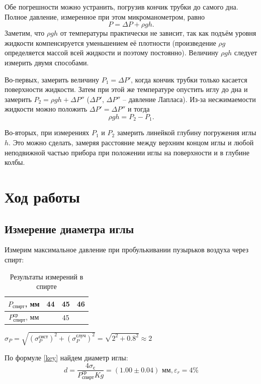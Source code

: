 \documentclass[a4paper,12pt]{article}
\theoremstyle{definition}
\begin{document}
	Обе погрешности можно устранить, погрузив кончик трубки до самого дна. Полное давление, измеренное при этом микроманометром, равно \[ P = \Delta P + \rho g h.\] Заметим, что $ \rho gh $ от температуры практически не зависит, так как подъём уровня жидкости компенсируется уменьшением её плотности (произведение $ \rho g $ определяется массой всей жидкости и поэтому постоянно). Величину  $ \rho g h $ следует измерить двумя способами.
	
	Во-первых, замерить величину $ P_1= \Delta P' $, когда кончик трубки только касается поверхности жидкости. Затем при этой же температуре опустить иглу до дна и замерить $ P_2= \rho gh + \Delta P'' $ ($ \Delta P' $, $ \Delta P'' $ -- давление Лапласа). Из-за  несжимаемости  жидкости можно положить $ \Delta P' = \Delta P'' $ и тогда \[ \rho gh= P_2 - P_1. \]
	
	Во-вторых, при измерениях $ P_1 $ и $ P_2 $ замерить линейкой  глубину погружения иглы $ h $. Это можно сделать, замеряя расстояние между верхним концом иглы и любой неподвижной частью прибора при положении иглы на поверхности и в глубине колбы.
\newpage
	
	\section{Ход работы}
 \subsection{Измерение диаметра иглы}
	Измерим максимальное давление при пробулькивании пузырьков воздуха через спирт:
	\begin{table}[H]
		\begin{center}
			\begin{tabular}{|c|c|c|c|}
				\hline
				$P_\text{спирт}$, мм&44&45&46\\
				\hline
				$P^{\text{ср}}_\text{спирт}$, мм& \multicolumn{3}{|c|}{45}\\
                \hline
			\end{tabular}
		\end{center}
		\caption{Результаты измерений в спирте}
		\label{tab1}
	\end{table}

    $\sigma_P = \sqrt{\left(\sigma_P^\text{сист}\right)^2 + \left(\sigma_P^\text{случ}\right)^2} = \sqrt{2^2 + 0.8^2} \approx 2$
 
	По формуле \eqref{key} найдем диаметр иглы:
	\begin{equation*}
		d = \frac{4\sigma_{\text{с}}}{P^{\text{ср}}_\text{спирт}Kg} = (1.00\pm 0.04)\text{ мм}, \varepsilon_r = 4\%
	\end{equation*}
\end{document}
